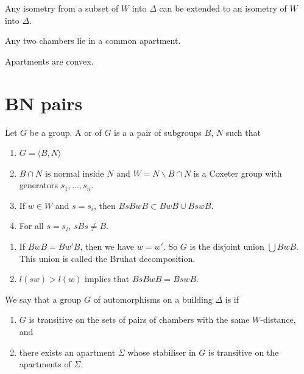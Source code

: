 \documentclass[11pt]{article}
\begin{document}
\begin{theorem}
    Any isometry from a subset of $W$ into $\Delta$ can be extended to an isometry of $W$ into $\Delta$.
\end{theorem}

\begin{corollary}
    Any two chambers lie in a common apartment.
\end{corollary}

\begin{theorem}
    Apartments are convex.
\end{theorem}

\section{BN pairs}
\begin{definition}
    Let $G$ be a group. A  or  of $G$ is a a pair of subgroups $B$, $N$ such that
    \begin{enumerate}
        \item $G=\langle B,N\rangle$
        \item $B\cap N$ is normal inside $N$ and $W=N\backslash B\cap N$ is a Coxeter group with generators $s_1,...,s_n$.
        \item If $w\in W$ and $s=s_i$, then $BsBwB\subset BwB\cup BswB$.
        \item For all $s=s_i$, $sBs\neq B$. 
    \end{enumerate}
\end{definition}
\begin{lemma}
    \begin{enumerate}
        \item If $BwB=Bw'B$, then we have $w=w'$. So $G$ is the disjoint union $\bigcup BwB$. This union is called the Bruhat decomposition.
        \item $l(sw)>l(w)$ implies that $BsBwB=BswB$. 
    \end{enumerate}
\end{lemma}

\begin{definition}
    We say that a group $G$ of automorphisms on a building $\Delta$ is  if 
    \begin{enumerate}
        \item $G$ is transitive on the sets of pairs of chambers with the same $W$-distance, and
        \item there exists an apartment $\Sigma$ whose stabiliser in $G$ is transitive on the apartments of $\Sigma$. 
    \end{enumerate}
\end{definition}
\end{document}
